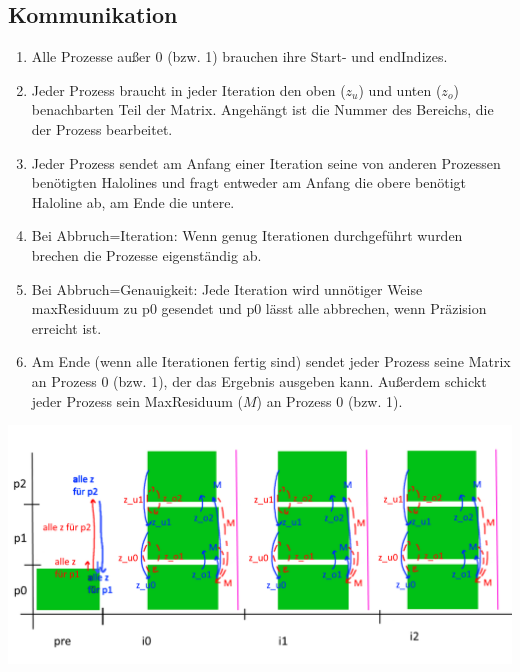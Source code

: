 \documentclass[a4paper,10pt]{article}
\begin{document}
\subsection*{Kommunikation}
\begin{enumerate}
 \item Alle Prozesse außer 0 (bzw. 1) brauchen ihre Start- und endIndizes.
 \item Jeder Prozess braucht in jeder Iteration den oben ($z_{u}$) und unten ($z_o$) benachbarten Teil der Matrix. Angehängt ist die Nummer des Bereichs, die der Prozess bearbeitet.
 \item Jeder Prozess sendet am Anfang einer Iteration seine von anderen Prozessen benötigten Halolines und fragt entweder am Anfang die obere benötigt Haloline ab, am Ende die untere.
 \item Bei Abbruch=Iteration: Wenn genug Iterationen durchgeführt wurden brechen die Prozesse eigenständig ab. 
 \item Bei Abbruch=Genauigkeit: Jede Iteration wird unnötiger Weise maxResiduum zu p0 gesendet und p0 lässt alle abbrechen, wenn Präzision erreicht ist.
 \item Am Ende (wenn alle Iterationen fertig sind) sendet jeder Prozess seine Matrix an Prozess 0 (bzw. 1), der das Ergebnis ausgeben kann. Außerdem schickt jeder Prozess sein MaxResiduum ($M$) an Prozess 0 (bzw. 1).
\end{enumerate}
\includegraphics[width=14cm]{Comms.png}
\end{document}
